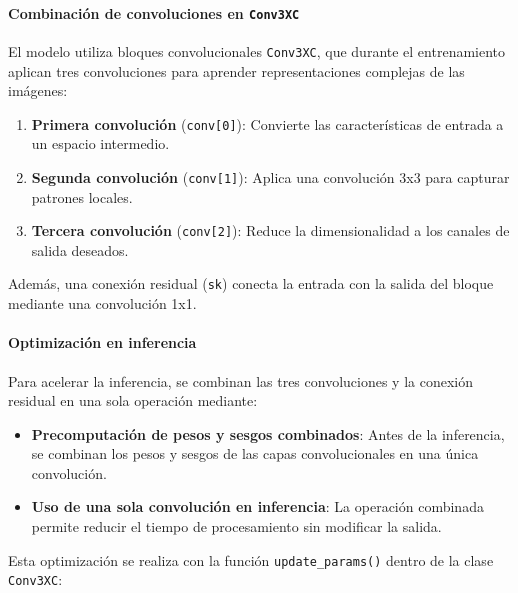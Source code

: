             \paragraph{Combinación de convoluciones en \texttt{Conv3XC}}

                El modelo utiliza bloques convolucionales \texttt{Conv3XC}, que durante el entrenamiento aplican tres convoluciones para aprender representaciones complejas de las imágenes:

                \begin{enumerate}
                    \item \textbf{Primera convolución} (\texttt{conv[0]}): Convierte las características de entrada a un espacio intermedio.
                    \item \textbf{Segunda convolución} (\texttt{conv[1]}): Aplica una convolución 3x3 para capturar patrones locales.
                    \item \textbf{Tercera convolución} (\texttt{conv[2]}): Reduce la dimensionalidad a los canales de salida deseados.
                \end{enumerate}

                Además, una conexión residual (\texttt{sk}) conecta la entrada con la salida del bloque mediante una convolución 1x1.

            \paragraph{Optimización en inferencia}

                Para acelerar la inferencia, se combinan las tres convoluciones y la conexión residual en una sola operación mediante:

                \begin{itemize}
                    \item \textbf{Precomputación de pesos y sesgos combinados}: Antes de la inferencia, se combinan los pesos y sesgos de las capas convolucionales en una única convolución.
                    \item \textbf{Uso de una sola convolución en inferencia}: La operación combinada permite reducir el tiempo de procesamiento sin modificar la salida.
                \end{itemize}

                Esta optimización se realiza con la función \texttt{update\_params()} dentro de la clase \texttt{Conv3XC}:

